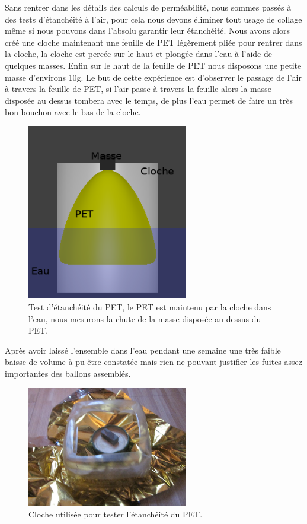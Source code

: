 \documentclass[a4paper,11pt]{article}
\begin{document}
Sans rentrer dans les détails des calculs de perméabilité, nous sommes passés à des tests d'étanchéité à l'air, pour cela nous devons éliminer tout usage de collage même si nous pouvons dans l'absolu garantir leur étanchéité.
Nous avons alors créé une cloche maintenant une feuille de PET légèrement pliée pour rentrer dans la cloche, la cloche est percée sur le haut et plongée dans l'eau à l'aide de quelques masses. Enfin sur le haut de la feuille de PET nous disposons une petite masse d'environs 10g.
Le but de cette expérience est d'observer le passage de l'air à travers la feuille de PET, si l'air passe à travers la feuille alors la masse disposée au dessus tombera avec le temps, de plus l'eau permet de faire un très bon bouchon avec le bas de la cloche.

\begin{figure}[H]
	\centering
	\includegraphics[width=7cm]{../Images/etancheite.png}
	\caption{Test d'étanchéité du PET, le PET est maintenu par la cloche dans l'eau, nous mesurons la chute de la masse disposée au dessus du PET.}
\end{figure}

Après avoir laissé l'ensemble dans l'eau pendant une semaine une très faible baisse de volume à pu être constatée mais rien ne pouvant justifier les fuites assez importantes des ballons assemblés.

\begin{figure}[H]
 \centering
 \includegraphics[width=7cm]{../Images/cloche_pet.JPG}
 \caption{Cloche utilisée pour tester l'étanchéité du PET.}
\end{figure}
\end{document}
